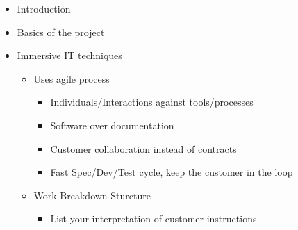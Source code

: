 
\date{15th August, 2011}
\apologies{-}
\absent{-}


\maketitle{}

\begin{itemize}
 \item Introduction
 \item Basics of the project

 \item Immersive IT techniques
 \begin{itemize}
  \item Uses agile process
  \begin{itemize}
   \item Individuals/Interactions against tools/processes
   \item Software over documentation
   \item Customer collaboration instead of contracts
   \item Fast Spec/Dev/Test cycle, keep the customer in the loop
  \end{itemize}
  \item Work Breakdown Sturcture
  \begin{itemize}
   \item List your interpretation of customer instructions
  \end{itemize}
 \end{itemize}
 
\end{itemize}


